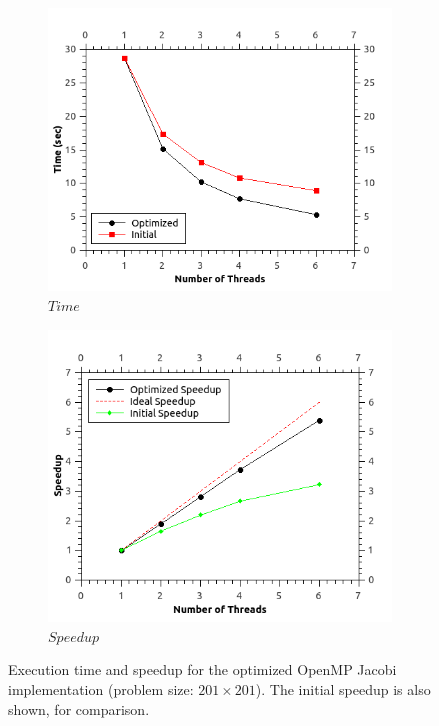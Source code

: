\documentclass[11pt]{report}
\begin{document}
\newpage

\begin{figure}[th!]
\centering
\begin{subfigure}{0.45\textwidth}
  \centering
  \includegraphics[width=1.0\linewidth]{images/jacobi_time_201_opt}
  \caption{$Time$}
\end{subfigure}
\begin{subfigure}{0.45\textwidth}
  \centering
  \includegraphics[width=1.0\linewidth]{images/jacobi_speedup_201_opt}
  \caption{$Speedup$}
\end{subfigure}
\caption{Execution time and speedup for the optimized OpenMP Jacobi implementation (problem size: $201 \times 201$). The initial speedup is also shown, for comparison. }
\label{fig:example5.4}
\end{figure}
\end{document}
